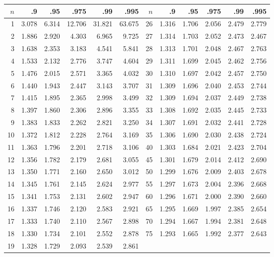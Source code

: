 {\small
\begin{tabular} {r|rrrrr||r|rrrrr}
$n$ & .9 & .95 & .975 & .99 & .995 &
$n$ & .9 & .95 & .975 & .99 & .995 \\ \hline
 1 & 3.078 & 6.314 & 12.706 & 31.821 & 63.675 &
26 & 1.316 & 1.706 & 2.056 & 2.479 & 2.779 \\
 2 & 1.886 & 2.920 & 4.303 & 6.965 & 9.725 &
27 & 1.314 & 1.703 & 2.052 & 2.473 & 2.467 \\
 3 & 1.638 & 2.353 & 3.183 & 4.541 & 5.841 &
28 & 1.313 & 1.701 & 2.048 & 2.467 & 2.763 \\
 4 & 1.533 & 2.132 & 2.776 & 3.747 & 4.604 &
29 & 1.311 & 1.699 & 2.045 & 2.462 & 2.756 \\
 5 & 1.476 & 2.015 & 2.571 & 3.365 & 4.032 & 
30 & 1.310 & 1.697 & 2.042 & 2.457 & 2.750 \\
\hline
 6 & 1.440 & 1.943 & 2.447 & 3.143 & 3.707 &
31 & 1.309 & 1.696 & 2.040 & 2.453 & 2.744 \\
 7 & 1.415 & 1.895 & 2.365 & 2.998 & 3.499 &
32 & 1.309 & 1.694 & 2.037 & 2.449 & 2.738 \\
 8 & 1.397 & 1.860 & 2.306 & 2.896 & 3.355 &
33 & 1.308 & 1.692 & 2.035 & 2.445 & 2.733 \\
 9 & 1.383 & 1.833 & 2.262 & 2.821 & 3.250 &
34 & 1.307 & 1.691 & 2.032 & 2.441 & 2.728 \\
10 & 1.372 & 1.812 & 2.228 & 2.764 & 3.169 &
35 & 1.306 & 1.690 & 2.030 & 2.438 & 2.724 \\
\hline
11 & 1.363 & 1.796 & 2.201 & 2.718 & 3.106 &
40 & 1.303 & 1.684 & 2.021 & 2.423 & 2.704 \\
12 & 1.356 & 1.782 & 2.179 & 2.681 & 3.055 &
45 & 1.301 & 1.679 & 2.014 & 2.412 & 2.690 \\
13 & 1.350 & 1.771 & 2.160 & 2.650 & 3.012 &
50 & 1.299 & 1.676 & 2.009 & 2.403 & 2.678 \\
14 & 1.345 & 1.761 & 2.145 & 2.624 & 2.977 &
55 & 1.297 & 1.673 & 2.004 & 2.396 & 2.668 \\
15 & 1.341 & 1.753 & 2.131 & 2.602 & 2.947 &
60 & 1.296 & 1.671 & 2.000 & 2.390 & 2.660 \\
\hline
16 & 1.337 & 1.746 & 2.120 & 2.583 & 2.921 &
65 & 1.295 & 1.669 & 1.997 & 2.385 & 2.654 \\
17 & 1.333 & 1.740 & 2.110 & 2.567 & 2.898 &
70 & 1.294 & 1.667 & 1.994 & 2.381 & 2.648 \\
18 & 1.330 & 1.734 & 2.101 & 2.552 & 2.878 &
75 & 1.293 & 1.665 & 1.992 & 2.377 & 2.643 \\
19 & 1.328 & 1.729 & 2.093 & 2.539 & 2.861 &

\end{tabular}}
